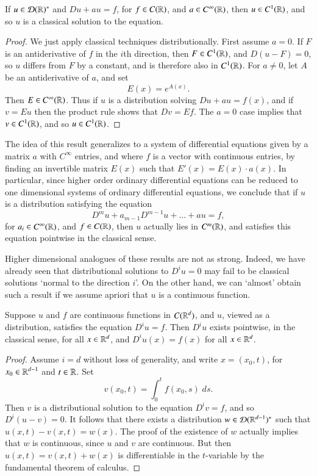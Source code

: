 \begin{lemma}
    If $u \in \operatorname{\mathcal{D}}(\operatorname{\mathbb{R}})^*$ and $Du + au = f$, for $f \in C(\operatorname{\mathbb{R}})$, and $a \in C^\infty(\operatorname{\mathbb{R}})$, then $u \in C^1(\operatorname{\mathbb{R}})$, and so $u$ is a classical solution to the equation.
\end{lemma}
\begin{proof}
    We just apply classical techniques distributionally. First assume $a = 0$. If $F$ is an antiderivative of $f$ in the $i$th direction, then $F \in C^1(\operatorname{\mathbb{R}})$, and $D(u - F) = 0$, so $u$ differs from $F$ by a constant, and is therefore also in $C^1(\operatorname{\mathbb{R}})$. For $a \neq 0$, let $A$ be an antiderivative of $a$, and set
    \[ E(x) = e^{A(x)}. \]
    Then $E \in C^\infty(\operatorname{\mathbb{R}})$. Thus if $u$ is a distribution solving $D u + a u = f(x)$, and if $v = E u$ then the product rule shows that $Dv = Ef$. The $a = 0$ case implies that $v \in C^1(\operatorname{\mathbb{R}})$, and so $u \in C^1(\operatorname{\mathbb{R}})$.
\end{proof}

\begin{remark}
    The idea of this result generalizes to a system of differential equations given by a matrix $a$ with $C^\infty$ entries, and where $f$ is a vector with continuous entries, by finding an invertible matrix $E(x)$ such that $E'(x) = E(x) \cdot a(x)$. In particular, since higher order ordinary differential equations can be reduced to one dimensional systems of ordinary differential equations, we conclude that if $u$ is a distribution satisfying the equation
    \[ D^m u + a_{m-1} D^{m-1} u + \dots + au = f, \]
    for $a_i \in C^\infty(\operatorname{\mathbb{R}})$, and $f \in C(\operatorname{\mathbb{R}})$, then $u$ actually lies in $C^m(\operatorname{\mathbb{R}})$, and satisfies this equation pointwise in the classical sense.
\end{remark}

Higher dimensional analogues of these results are not as strong. Indeed, we have already seen that distributional solutions to $D^i u = 0$ may fail to be classical solutions `normal to the direction $i$'. On the other hand, we can `almost' obtain such a result if we assume apriori that $u$ is a continuous function.

\begin{lemma}
    Suppose $u$ and $f$ are continuous functions in $C(\operatorname{\mathbb{R}}^d)$, and $u$, viewed as a distribution, satisfies the equation $D^i u = f$. Then $D^i u$ exists pointwise, in the classical sense, for all $x \in \operatorname{\mathbb{R}}^d$, and $D^i u (x) = f(x)$ for all $x \in \operatorname{\mathbb{R}}^d$.
\end{lemma}
\begin{proof}
    Assume $i = d$ without loss of generality, and write $x = (x_0,t)$, for $x_0 \in \operatorname{\mathbb{R}}^{d-1}$ and $t \in \operatorname{\mathbb{R}}$. Set
    \[ v(x_0,t) = \int_0^t f(x_0,s)\; ds. \]
    Then $v$ is a distributional solution to the equation $D^i v = f$, and so $D^i(u - v) = 0$. It follows that there exists a distribution $w \in \operatorname{\mathcal{D}}(\operatorname{\mathbb{R}}^{d-1})^*$ such that $u(x,t) - v(x,t) = w(x)$. The proof of the existence of $w$ actually implies that $w$ is continuous, since $u$ and $v$ are continuous. But then $u(x,t) = v(x,t) + w(x)$ is differentiable in the $t$-variable by the fundamental theorem of calculus.
\end{proof}

